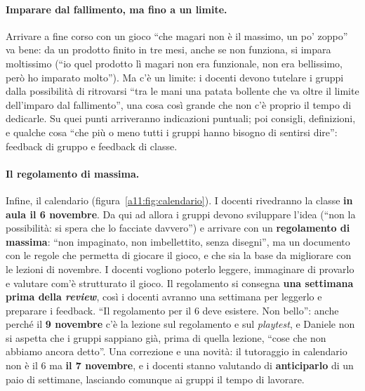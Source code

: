 \paragraph{Imparare dal fallimento, ma fino a un limite.} Arrivare a fine corso con un
gioco ``che magari non è il massimo, un po' zoppo'' va bene: da un prodotto finito in tre
mesi, anche se non funziona, si impara moltissimo (``io quel prodotto lì magari non era
funzionale, non era bellissimo, però ho imparato molto''). Ma c'è un limite: i docenti
devono tutelare i gruppi dalla possibilità di ritrovarsi ``tra le mani una patata
bollente che va oltre il limite dell'imparo dal fallimento'', una cosa così grande che
non c'è proprio il tempo di dedicarle. Su quei punti arriveranno indicazioni puntuali;
poi consigli, definizioni, e qualche cosa ``che più o meno tutti i gruppi hanno bisogno
di sentirsi dire'': feedback di gruppo e feedback di classe.

\paragraph{Il regolamento di massima.} Infine, il calendario
(figura~\ref{a11:fig:calendario}). I docenti rivedranno la classe \textbf{in aula il 6
novembre}. Da qui ad allora i gruppi devono sviluppare l'idea (``non la possibilità: si
spera che lo facciate davvero'') e arrivare con un \textbf{regolamento di massima}:
``non impaginato, non imbellettito, senza disegni'', ma un documento con le regole che
permetta di giocare il gioco, e che sia la base da migliorare con le lezioni di novembre.
I docenti vogliono poterlo leggere, immaginare di provarlo e valutare com'è strutturato
il gioco. Il regolamento si consegna \textbf{una settimana prima della \emph{review}},
così i docenti avranno una settimana per leggerlo e preparare i feedback. ``Il
regolamento per il 6 deve esistere. Non bello'': anche perché il \textbf{9 novembre} c'è
la lezione sul regolamento e sul \emph{playtest}, e Daniele non si aspetta che i gruppi
sappiano già, prima di quella lezione, ``cose che non abbiamo ancora detto''. Una
correzione e una novità: il tutoraggio in calendario non è il 6 ma \textbf{il 7
novembre}, e i docenti stanno valutando di \textbf{anticiparlo} di un paio di settimane,
lasciando comunque ai gruppi il tempo di lavorare.

